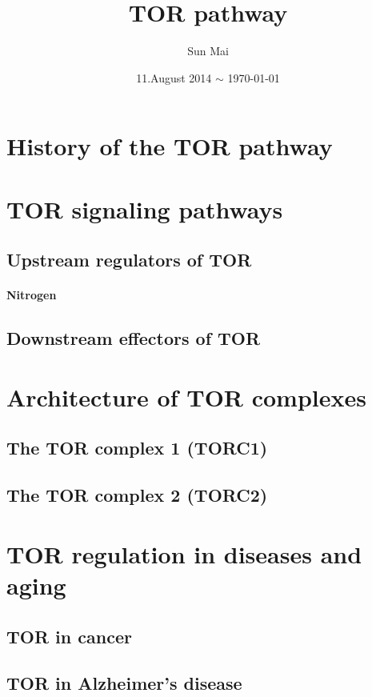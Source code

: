\documentclass[a4paper, 11pt]{article}
\begin{document}
\title{TOR pathway}
\author{Sun Mai}
\date{11.August 2014 $\sim$ \today}
\maketitle

\pagestyle{fancy}
\fancyhead{}
\fancyhead[R]{\slshape \leftmark}
\fancyfoot[C]{\thepage}

\newpage
\tableofcontents

\newpage
\sloppy
\section{History of the TOR pathway}
	\subsection{}
		\paragraph{}
\section{TOR signaling pathways}
	\subsection{Upstream regulators of TOR}
		\paragraph{Nitrogen}
	\subsection{Downstream effectors of TOR}
\section{Architecture of TOR complexes}
	\subsection{The TOR complex 1 (TORC1)}
	\subsection{The TOR complex 2 (TORC2)}
\section{TOR regulation in diseases and aging}
	\subsection{TOR in cancer}
	\subsection{TOR in Alzheimer's disease}


\renewcommand{\bibname}{References} %
\end{document}
